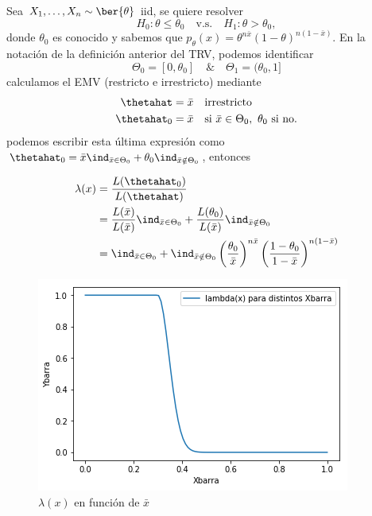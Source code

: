 \begin{example}
	Sea $X_1,\ldots,X_n\sim\ber{\theta}$ iid, se quiere resolver
	\begin{equation}
		H_0:\theta \leq\theta_0\quad \text{v.s.}\quad H_1:\theta >\theta_0,
	\end{equation}
donde $\theta_0$ es conocido y sabemos que $p_\theta(x) = \theta^{n\bar{x}}(1-\theta)^{n(1-\bar{x})}$. En la notación de la definición anterior del TRV, podemos identificar
\begin{equation}
	\Theta_0 = [0,\theta_0] \quad \& \quad \Theta_1 = (\theta_0, 1]
\end{equation}
calculamos el EMV (restricto e irrestricto) mediante 
\begin{align}
	\thetahat &= \bar{x}\quad \text{irrestricto}\\
	\thetahat_0 &= \bar{x} \quad \text{si } \bar{x}\in\Theta_0,\ \theta_0 \text{ si no.}
\end{align}
podemos escribir esta última expresión como $\thetahat_0 = \bar{x} \ind_{\bar{x}\in\Theta_0} + \theta_0\ind_{\bar{x}\notin\Theta_0}$, entonces

\begin{align}
	\lambda(x) &= \frac{L(\thetahat_0)}{L(\thetahat)}\\ 
				&= \frac{L(\bar{x})}{L(\bar{x})} \ind_{\bar{x}\in\Theta_0} + \frac{L(\theta_0)}{L(\bar{x})} \ind_{\bar{x}\notin\Theta_0} \\
				&= \ind_{\bar{x}\in\Theta_0} + \ind_{\bar{x}\notin\Theta_0} \left(\frac{\theta_0}{\bar{x}}\right)^{n\bar{x}}\left(\frac{1-\theta_0}{1-\bar{x}}\right)^{n(1-\bar{x})}
\end{align}
\begin{figure}[ht]
    \centering
    \includegraphics[scale=0.7]{img/LKratio.png}
    \caption{$\lambda(x)$ en función de $\bar{x}$}
    \label{fig:lk_ratio}
\end{figure}


\end{example}
